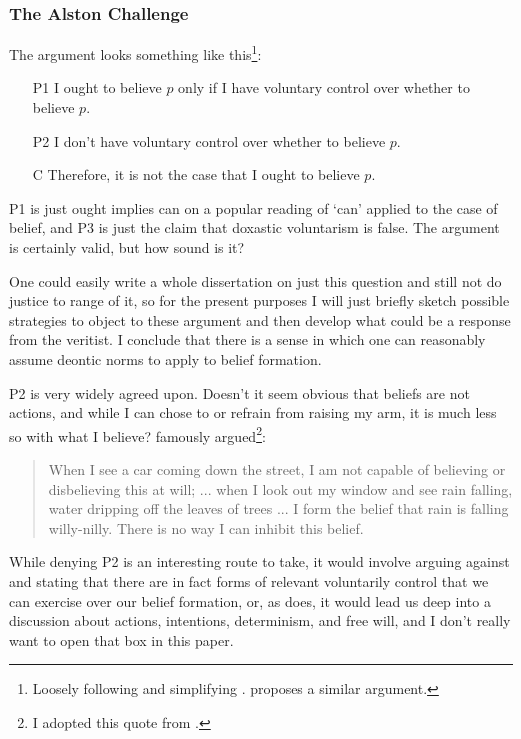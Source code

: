 \documentclass[12pt,numbers=noenddot]{scrartcl}
\begin{document}
\subsubsection{The Alston Challenge}

The argument looks something like this\footnote{Loosely following and simplifying \textcite{Alston1988-ALSTDC}. \textcite{Feldman2000-FELTEO-2} proposes a similar argument.}:

\begin{enumerate}
    \item[P1] I ought to believe $p$ only if I have voluntary control over whether to believe $p$.
    \item[P2] I don't have voluntary control over whether to believe $p$.
    \item[C] Therefore, it is not the case that I ought to believe $p$.
\end{enumerate}

P1 is just ought implies can on a popular reading of ‘can’ applied to the case of belief, and P3 is just the claim that doxastic voluntarism is false. The argument is certainly valid, but how sound is it?

One could easily write a whole dissertation on just this question and still not do justice to range of it, so for the present purposes I will just briefly sketch possible strategies to object to these argument and then develop what could be a response from the veritist. I conclude that there is a sense in which one can reasonably assume deontic norms to apply to belief formation.

P2 is very widely agreed upon. Doesn't it seem obvious that beliefs are not actions, and while I can chose to or refrain from raising my arm, it is much less so with what I believe? \textcite[91]{Alston1989} famously argued\footnote{I adopted this quote from \textcite{Steup2000-STEDVA}.}:

\begin{quote}
    When I see a car coming down the street, I am not capable of believing or disbelieving this at will; ... when I look out my window and see rain falling, water dripping off the leaves of trees ... I form the belief that rain is falling willy-nilly. There is no way I can inhibit this belief.
\end{quote}

While denying P2 is an interesting route to take, it would involve arguing against \textcite{Alston1988-ALSTDC} and stating that there are in fact forms of relevant voluntarily control that we can exercise over our belief formation, or, as \textcite{Steup2000-STEDVA} does, it would lead us deep into a discussion about actions, intentions, determinism, and free will, and I don't really want to open that box in this paper. 
\end{document}
